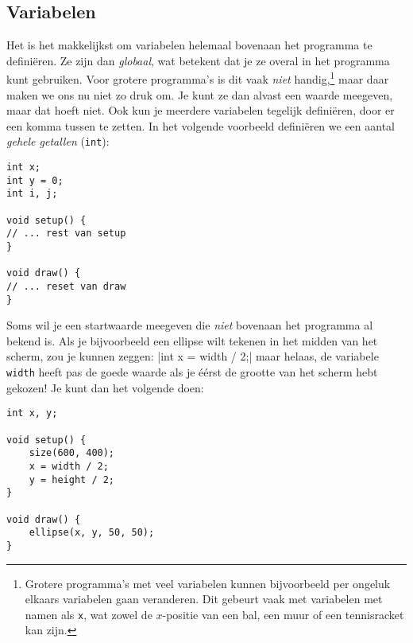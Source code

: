 \documentclass[a4paper,11pt]{report}
\begin{document}
\subsection{Variabelen}

Het is het makkelijkst om variabelen helemaal bovenaan het programma te
definiëren.  Ze zijn dan \emph{globaal}, wat betekent dat je ze overal in
het programma kunt gebruiken.  Voor grotere programma's is dit vaak
\emph{niet} handig,\footnote{Grotere programma's met veel variabelen kunnen
bijvoorbeeld per ongeluk elkaars variabelen gaan veranderen.  Dit gebeurt
vaak met variabelen met namen als \verb|x|, wat zowel de $x$-positie van
een bal, een muur of een tennisracket kan zijn.} maar daar maken we ons
nu niet zo druk om.  Je kunt ze dan alvast een waarde meegeven, maar dat
hoeft niet.  Ook kun je meerdere variabelen tegelijk definiëren, door er
een komma tussen te zetten.  In het volgende voorbeeld definiëren we een
aantal \emph{gehele getallen} (\verb|int|):
\begin{verbatim}
int x;
int y = 0;
int i, j;

void setup() {
// ... rest van setup
}

void draw() {
// ... reset van draw
}
\end{verbatim}
Soms wil je een startwaarde meegeven die \emph{niet} bovenaan het
programma al bekend is.  Als je bijvoorbeeld een ellipse wilt tekenen in
het midden van het scherm, zou je kunnen zeggen:
|int x = width / 2;| maar helaas, de variabele \verb|width|
heeft pas de goede waarde als je éérst de grootte van het scherm hebt
gekozen!  Je kunt dan het volgende doen:
\begin{verbatim}
int x, y;

void setup() {
    size(600, 400);
    x = width / 2;
    y = height / 2;
}

void draw() {
    ellipse(x, y, 50, 50);
}
\end{verbatim}
\end{document}
